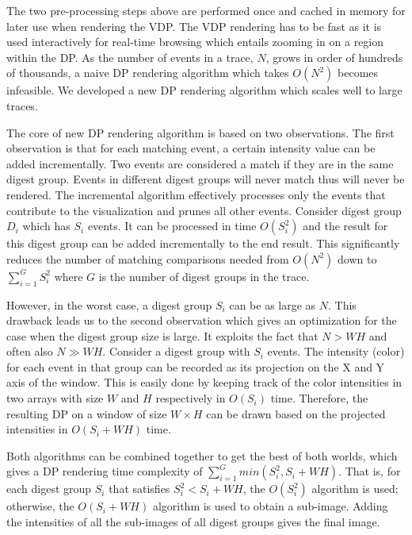 The two pre-processing steps above are performed once and
cached in memory for later use when rendering the VDP.
The VDP rendering has to be fast as it is
used interactively for real-time browsing 
which entails zooming in on a region within the DP.
As the number of events in a trace, $N$, grows in order of hundreds of thousands,
a naive DP rendering algorithm which takes $O(N^2)$ becomes infeasible.
We developed a new DP rendering algorithm which scales well to large traces.

The core of new DP rendering algorithm is based on two observations.
The first observation is that for each matching event,
a certain intensity value can be added incrementally.
Two events are considered a match if they are in the same digest group.
Events in different digest groups will never match thus will never be rendered.
The incremental algorithm effectively processes only the events
that contribute to the visualization and prunes all other events.
Consider digest group $D_i$ which has $S_i$ events.
It can be processed in time $O(S_i^2)$
and the result for this digest group can be added incrementally to the 
end result.
This significantly reduces the number of matching comparisons needed
from $O(N^2)$ down to $\sum_{i=1}^{G} S_i^2$
where $G$ is the number of digest groups in the trace.

However, in the worst case, a digest group $S_i$ can be as large as $N$.
This drawback leads us to the second observation which
gives an optimization for the case when the digest group size is large.
It exploits the fact that $N > W H$ and often also $N \gg WH$.
Consider a digest group with $S_i$ events.
The intensity (color) for each event in that group can be recorded as
its projection on the X and Y axis of the window.
This is easily done by keeping track of the color intensities in
two arrays with size $W$ and $H$ respectively in $O(S_i)$ time.
Therefore, the resulting DP on a window of size $W \times H$
can be drawn based on the projected intensities in $O(S_i + W H)$ time.

Both algorithms can be combined together to
get the best of both worlds, which gives
a DP rendering time complexity of $\sum_{i=1}^{G} min(S_i^2, S_i + W H)$.
That is, for each digest group $S_i$ that satisfies $S_i^2 < S_i+W H$, 
the $O(S_i^2)$ algorithm is used;
otherwise, the $O(S_i + W H)$ algorithm is used to obtain a sub-image.
Adding the intensities of all the sub-images of all digest groups gives the final image.

